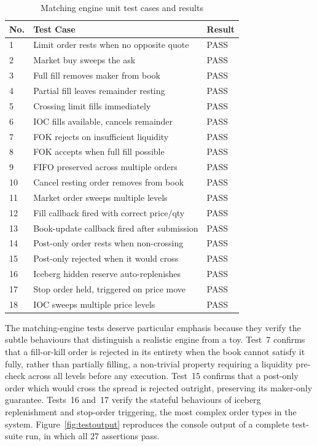 \documentclass[12pt,oneside,a4paper]{report}
\begin{document}
\begin{table}[H]
\centering
\caption{Matching engine unit test cases and results}
\label{tab:matchingtests}
\small
\begin{tabular}{p{0.4in}p{3.4in}p{0.9in}}
\toprule
\textbf{No.} & \textbf{Test Case} & \textbf{Result} \\
\midrule
1 & Limit order rests when no opposite quote & PASS \\
2 & Market buy sweeps the ask & PASS \\
3 & Full fill removes maker from book & PASS \\
4 & Partial fill leaves remainder resting & PASS \\
5 & Crossing limit fills immediately & PASS \\
6 & IOC fills available, cancels remainder & PASS \\
7 & FOK rejects on insufficient liquidity & PASS \\
8 & FOK accepts when full fill possible & PASS \\
9 & FIFO preserved across multiple orders & PASS \\
10 & Cancel resting order removes from book & PASS \\
11 & Market order sweeps multiple levels & PASS \\
12 & Fill callback fired with correct price/qty & PASS \\
13 & Book-update callback fired after submission & PASS \\
14 & Post-only order rests when non-crossing & PASS \\
15 & Post-only rejected when it would cross & PASS \\
16 & Iceberg hidden reserve auto-replenishes & PASS \\
17 & Stop order held, triggered on price move & PASS \\
18 & IOC sweeps multiple price levels & PASS \\
\bottomrule
\end{tabular}
\end{table}

The matching-engine tests deserve particular emphasis because they verify the subtle behaviours that distinguish a realistic engine from a toy. Test~7 confirms that a fill-or-kill order is rejected in its entirety when the book cannot satisfy it fully, rather than partially filling, a non-trivial property requiring a liquidity pre-check across all levels before any execution. Test~15 confirms that a post-only order which would cross the spread is rejected outright, preserving its maker-only guarantee. Tests~16 and~17 verify the stateful behaviours of iceberg replenishment and stop-order triggering, the most complex order types in the system. Figure~\ref{fig:testoutput} reproduces the console output of a complete test-suite run, in which all 27 assertions pass.
\end{document}
